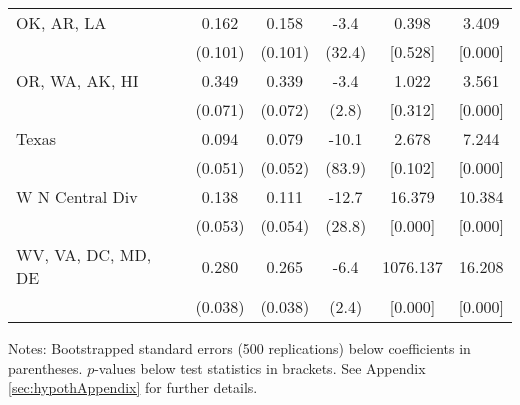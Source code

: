 \begin{landscape}
\begin{table}[ht]
{\begin{threeparttable}
\begin{tabular}{lccccc}
OK, AR, LA & 0.162 & 0.158 & -3.4 & 0.398 & 3.409 \\ 
 & (0.101) & (0.101) & (32.4) & [0.528] & [0.000] \\ 
OR, WA, AK, HI & 0.349 & 0.339 & -3.4 & 1.022 & 3.561 \\ 
 & (0.071) & (0.072) & (2.8) & [0.312] & [0.000] \\ 
Texas & 0.094 & 0.079 & -10.1 & 2.678 & 7.244 \\ 
 & (0.051) & (0.052) & (83.9) & [0.102] & [0.000] \\ 
W N Central Div & 0.138 & 0.111 & -12.7 & 16.379 & 10.384 \\ 
 & (0.053) & (0.054) & (28.8) & [0.000] & [0.000] \\ 
WV, VA, DC, MD, DE & 0.280 & 0.265 & -6.4 & 1076.137 & 16.208 \\ 
 & (0.038) & (0.038) & (2.4) & [0.000] & [0.000] \\ 
\bottomrule
\end{tabular}
{\footnotesize {\raggedright Notes: Bootstrapped standard errors (500 replications) below coefficients in parentheses. $p$-values below test statistics in brackets. See Appendix \ref{sec:hypothAppendix} for further details.}}
\end{threeparttable}
}
\end{table}
\end{landscape}
